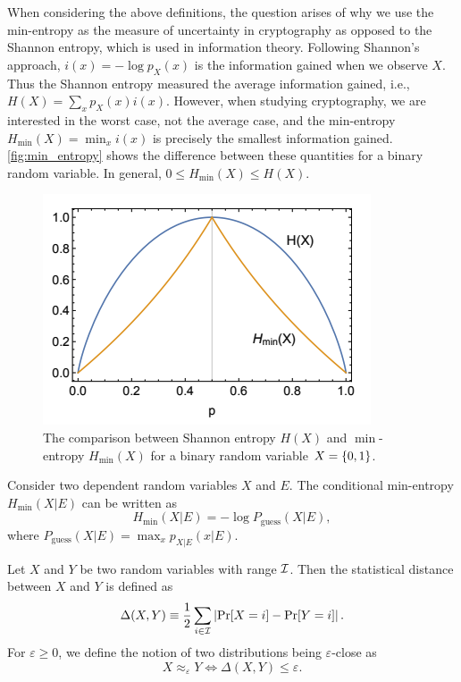 When considering the above definitions, the question arises of why we use the min-entropy as the measure of uncertainty in cryptography as opposed to the Shannon entropy, which is used in information theory. Following Shannon’s approach, $i(x) =  -\log p_X(x)$ is the information gained when we observe $X$. Thus the Shannon entropy measured the average information gained, i.e.,  $H(X) = \sum_x p_X(x) i(x)$. However, when studying cryptography, we are interested in the worst case, not the average case, and the min-entropy $H_{\min}(X) = \min _x i(x)$ is precisely the smallest information gained. \autoref{fig:min_entropy} shows the difference between these quantities for a binary random variable. In general, $0\leq H_{\min}(X) \leq H(X)$.
\begin{figure}[!htb]
    \centering
    \includegraphics[scale=0.6]{Images/entropy.png}
    \caption{The comparison between Shannon entropy $H(X)$ and $\min$-entropy $H_{\min}(X)$ for a binary random variable $X = \{0,1\}$.}
    \label{fig:min_entropy}
\end{figure}

\begin{definition}
Consider two dependent random variables $X$ and $E$. The conditional min-entropy $H_{\min}(X|E)$ can be written as
\[H_{\min}(X|E) = -\log P_{\text{guess}}(X|E),\]
where $P_{\text{guess}}(X|E) = \max_x p_{X|E}(x|E)$.
\end{definition}

\begin{definition}
    Let $X$ and $Y$ be two random variables with range $\mathcal{I}$. Then the statistical distance between $X$ and $Y$ is defined as
    \[
        \Delta(X, Y) \equiv \frac{1}{2} \sum_{i \in \mathcal{I}} \left|\Pr[X=i]-\Pr[Y=i]\right|.
    \]
    For $\varepsilon \geq 0$, we define the notion of two distributions being $\varepsilon$-close as
    \[
        X \approx_{\varepsilon} Y \iff \Delta(X, Y) \leq \varepsilon.
    \]
\end{definition}

